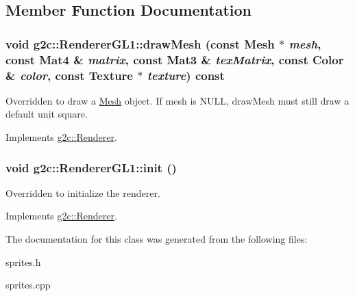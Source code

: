 \subsection{Member Function Documentation}
\hypertarget{classg2c_1_1_renderer_g_l1_a26b67e30372294a022b981fa6b0d76c4}{
\subsubsection[{drawMesh}]{\setlength{\rightskip}{0pt plus 5cm}void g2c::RendererGL1::drawMesh (const {\bf Mesh} $\ast$ {\em mesh}, \/  const Mat4 \& {\em matrix}, \/  const Mat3 \& {\em texMatrix}, \/  const {\bf Color} \& {\em color}, \/  const {\bf Texture} $\ast$ {\em texture}) const}}
\label{classg2c_1_1_renderer_g_l1_a26b67e30372294a022b981fa6b0d76c4}
Overridden to draw a \hyperlink{classg2c_1_1_mesh}{Mesh} object. If mesh is NULL, drawMesh must still draw a default unit square. 

Implements \hyperlink{classg2c_1_1_renderer_a60445bc0c7ec75f1c7ee20066c25f8b3}{g2c::Renderer}.\hypertarget{classg2c_1_1_renderer_g_l1_a3577eea69cf61c38dc3595b24251fab7}{
\subsubsection[{init}]{\setlength{\rightskip}{0pt plus 5cm}void g2c::RendererGL1::init ()}}
\label{classg2c_1_1_renderer_g_l1_a3577eea69cf61c38dc3595b24251fab7}
Overridden to initialize the renderer. 

Implements \hyperlink{classg2c_1_1_renderer_adcfacb02cf062a77f0fb71ab30dbae76}{g2c::Renderer}.

The documentation for this class was generated from the following files:\begin{DoxyCompactItemize}
\item 
sprites.h\item 
sprites.cpp\end{DoxyCompactItemize}

